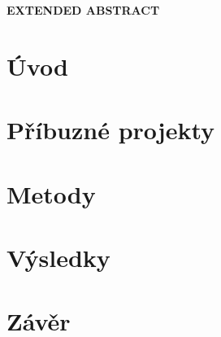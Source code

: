 \cleardoublepage
\noindent
{\large\sffamily\bfseries\MakeUppercase{Extended Abstract}}
\section*{Úvod}
\section*{Příbuzné projekty}
\section*{Metody}
\section*{Výsledky}
\section*{Závěr}

